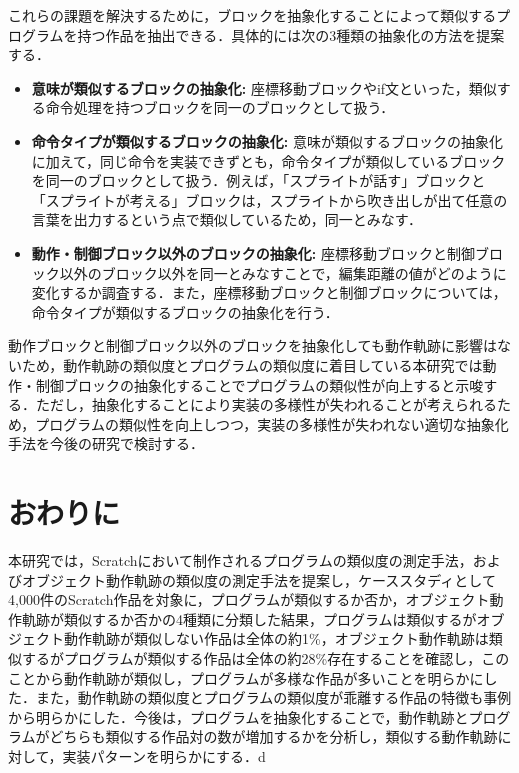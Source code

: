 \documentclass[T,J]{fose} %
\begin{document}
これらの課題を解決するために，ブロックを抽象化することによって類似するプログラムを持つ作品を抽出できる．具体的には次の3種類の抽象化の方法を提案する．
\begin{itemize}
    \item \textbf{意味が類似するブロックの抽象化: }座標移動ブロックやif文といった，類似する命令処理を持つブロックを同一のブロックとして扱う．
    \item \textbf{命令タイプが類似するブロックの抽象化: }意味が類似するブロックの抽象化に加えて，同じ命令を実装できずとも，命令タイプが類似しているブロックを同一のブロックとして扱う．例えば，「スプライトが話す」ブロックと「スプライトが考える」ブロックは，スプライトから吹き出しが出て任意の言葉を出力するという点で類似しているため，同一とみなす．
    \item \textbf{動作・制御ブロック以外のブロックの抽象化: }座標移動ブロックと制御ブロック以外のブロック以外を同一とみなすことで，編集距離の値がどのように変化するか調査する．また，座標移動ブロックと制御ブロックについては，命令タイプが類似するブロックの抽象化を行う．
\end{itemize}


動作ブロックと制御ブロック以外のブロックを抽象化しても動作軌跡に影響はないため，動作軌跡の類似度とプログラムの類似度に着目している本研究では動作・制御ブロックの抽象化することでプログラムの類似性が向上すると示唆する．ただし，抽象化することにより実装の多様性が失われることが考えられるため，プログラムの類似性を向上しつつ，実装の多様性が失われない適切な抽象化手法を今後の研究で検討する．




\section{おわりに}\label{sec:con}

本研究では，Scratchにおいて制作されるプログラムの類似度の測定手法，およびオブジェクト動作軌跡の類似度の測定手法を提案し，ケーススタディとして4,000件のScratch作品を対象に，プログラムが類似するか否か，オブジェクト動作軌跡が類似するか否かの4種類に分類した結果，プログラムは類似するがオブジェクト動作軌跡が類似しない作品は全体の約1\%，オブジェクト動作軌跡は類似するがプログラムが類似する作品は全体の約28\%存在することを確認し，このことから動作軌跡が類似し，プログラムが多様な作品が多いことを明らかにした．また，動作軌跡の類似度とプログラムの類似度が乖離する作品の特徴も事例から明らかにした．今後は，プログラムを抽象化することで，動作軌跡とプログラムがどちらも類似する作品対の数が増加するかを分析し，類似する動作軌跡に対して，実装パターンを明らかにする．d
\end{document}
